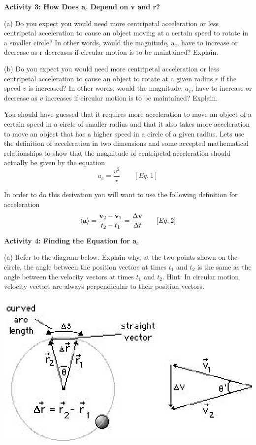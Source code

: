 \textbf{Activity 3: How Does a\( _{c} \) Depend on v and r?} 

(a) Do you expect you would need more centripetal acceleration or less centripetal
acceleration to cause an object moving at a certain speed to rotate in a smaller
circle? In other words, would the magnitude, a\( _{c} \), have to increase
or decrease as r decreases if circular motion is to be maintained? Explain.
\vspace{20mm}

(b) Do you expect you would need more centripetal acceleration or less centripetal
acceleration to cause an object to rotate at a given radius $r$ if the speed $v$
is increased? In other words, would the magnitude, \( a_{c} \), have to increase
or decrease as $v$ increases if circular motion is to be maintained? Explain.
\vspace{20mm}

You should have guessed that it requires more acceleration to move an object
of a certain speed in a circle of smaller radius and that it also takes more
acceleration to move an object that has a higher speed in a circle of a given
radius. Lets use the definition of acceleration in two dimensions and some accepted
mathematical relationships to show that the magnitude of centripetal acceleration
should actually be given by the equation
\[
a_{c}=\frac{v^{2}}{r}\qquad [Eq.\: 1]\]


In order to do this derivation you will want to use the following definition
for acceleration
\[
\left\langle {\bf a}\right\rangle =\frac{{{\bf v}_{2}}-{{\bf v}_{1}}}{t_{2}-t_{1}}=\frac{\Delta {\bf v}}{\Delta t}\qquad [Eq.\: 2]\]


\textbf{Activity 4: Finding the Equation for a\( _{c} \) }

(a) Refer to the diagram below. Explain why, at the two points shown on the
circle, the angle between the position vectors at times \( t_{1} \) and \( t_{2} \)
is the same as the angle between the velocity vectors at times \( t_{1} \)
and \( t_{2} \). Hint: In circular motion, velocity vectors are always perpendicular
to their position vectors.

\vspace{0.3cm}
{\par\raggedright \includegraphics{circ_motion/circ_motion_fig3.eps} \par}
\vspace{0.3cm}

